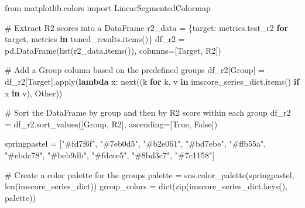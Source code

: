 \documentclass[
  letterpaper,
  DIV=11,
  numbers=noendperiod]{scrartcl}
\newenvironment{Shaded}{\begin{snugshade}}{\end{snugshade}}
\newcommand{\BuiltInTok}[1]{\textcolor[rgb]{0.00,0.23,0.31}{#1}}
\newcommand{\CommentTok}[1]{\textcolor[rgb]{0.37,0.37,0.37}{#1}}
\newcommand{\ControlFlowTok}[1]{\textcolor[rgb]{0.00,0.23,0.31}{\textbf{#1}}}
\newcommand{\ImportTok}[1]{\textcolor[rgb]{0.00,0.46,0.62}{#1}}
\newcommand{\KeywordTok}[1]{\textcolor[rgb]{0.00,0.23,0.31}{\textbf{#1}}}
\newcommand{\NormalTok}[1]{\textcolor[rgb]{0.00,0.23,0.31}{#1}}
\newcommand{\OperatorTok}[1]{\textcolor[rgb]{0.37,0.37,0.37}{#1}}
\newcommand{\StringTok}[1]{\textcolor[rgb]{0.13,0.47,0.30}{#1}}
\newcommand{\VariableTok}[1]{\textcolor[rgb]{0.07,0.07,0.07}{#1}}
\begin{document}
\begin{Shaded}
\begin{Highlighting}[]
\ImportTok{from}\NormalTok{ matplotlib.colors }\ImportTok{import}\NormalTok{ LinearSegmentedColormap}

\CommentTok{\# Extract R2 scores into a DataFrame}
\NormalTok{r2\_data }\OperatorTok{=}\NormalTok{ \{target: metrics.test\_r2 }\ControlFlowTok{for}\NormalTok{ target, metrics }\KeywordTok{in}\NormalTok{ tuned\_results.items()\}}
\NormalTok{df\_r2 }\OperatorTok{=}\NormalTok{ pd.DataFrame(}\BuiltInTok{list}\NormalTok{(r2\_data.items()), columns}\OperatorTok{=}\NormalTok{[}\StringTok{\textquotesingle{}Target\textquotesingle{}}\NormalTok{, }\StringTok{\textquotesingle{}R2\textquotesingle{}}\NormalTok{])}

\CommentTok{\# Add a \textquotesingle{}Group\textquotesingle{} column based on the predefined groups}
\NormalTok{df\_r2[}\StringTok{\textquotesingle{}Group\textquotesingle{}}\NormalTok{] }\OperatorTok{=}\NormalTok{ df\_r2[}\StringTok{\textquotesingle{}Target\textquotesingle{}}\NormalTok{].}\BuiltInTok{apply}\NormalTok{(}\KeywordTok{lambda}\NormalTok{ x: }\BuiltInTok{next}\NormalTok{((k }\ControlFlowTok{for}\NormalTok{ k, v }\KeywordTok{in}\NormalTok{ imscore\_series\_dict.items() }\ControlFlowTok{if}\NormalTok{ x }\KeywordTok{in}\NormalTok{ v), }\StringTok{\textquotesingle{}Other\textquotesingle{}}\NormalTok{))}

\CommentTok{\# Sort the DataFrame by group and then by R2 score within each group}
\NormalTok{df\_r2 }\OperatorTok{=}\NormalTok{ df\_r2.sort\_values([}\StringTok{\textquotesingle{}Group\textquotesingle{}}\NormalTok{, }\StringTok{\textquotesingle{}R2\textquotesingle{}}\NormalTok{], ascending}\OperatorTok{=}\NormalTok{[}\VariableTok{True}\NormalTok{, }\VariableTok{False}\NormalTok{])}

\NormalTok{springpastel }\OperatorTok{=}\NormalTok{ [}\StringTok{"\#fd7f6f"}\NormalTok{, }\StringTok{"\#7eb0d5"}\NormalTok{, }\StringTok{"\#b2e061"}\NormalTok{, }\StringTok{"\#bd7ebe"}\NormalTok{, }\StringTok{"\#ffb55a"}\NormalTok{, }\StringTok{"\#ebdc78"}\NormalTok{, }\StringTok{"\#beb9db"}\NormalTok{, }\StringTok{"\#fdcce5"}\NormalTok{, }\StringTok{"\#8bd3c7"}\NormalTok{, }\StringTok{"\#7c1158"}\NormalTok{]}

\CommentTok{\# Create a color palette for the groups}
\NormalTok{palette }\OperatorTok{=}\NormalTok{ sns.color\_palette(springpastel, }\BuiltInTok{len}\NormalTok{(imscore\_series\_dict))}
\NormalTok{group\_colors }\OperatorTok{=} \BuiltInTok{dict}\NormalTok{(}\BuiltInTok{zip}\NormalTok{(imscore\_series\_dict.keys(), palette))}


\end{Highlighting}
\end{Shaded}
\end{document}

